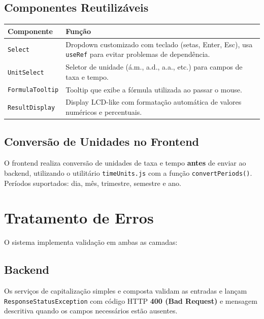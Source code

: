 \documentclass[12pt,a4paper]{article}
\begin{document}
\subsection{Componentes Reutilizáveis}

\begin{center}
\begin{tabular}{lp{8cm}}
  \toprule
  \textbf{Componente} & \textbf{Função} \\
  \midrule
  \texttt{Select}           & Dropdown customizado com teclado (setas, Enter, Esc), usa \texttt{useRef} para evitar problemas de dependência. \\
  \texttt{UnitSelect}       & Seletor de unidade (á.m., a.d., a.a., etc.) para campos de taxa e tempo. \\
  \texttt{FormulaTooltip}   & Tooltip que exibe a fórmula utilizada ao passar o mouse. \\
  \texttt{ResultDisplay}    & Display LCD-like com formatação automática de valores numéricos e percentuais. \\
  \bottomrule
\end{tabular}
\end{center}

\subsection{Conversão de Unidades no Frontend}

O frontend realiza conversão de unidades de taxa e tempo \textbf{antes} de enviar ao backend, utilizando o utilitário \texttt{timeUnits.js} com a função \texttt{convertPeriods()}. Períodos suportados: dia, mês, trimestre, semestre e ano.

\section{Tratamento de Erros}

O sistema implementa validação em ambas as camadas:

\subsection{Backend}

Os serviços de capitalização simples e composta validam as entradas e lançam \texttt{ResponseStatusException} com código HTTP \textbf{400 (Bad Request)} e mensagem descritiva quando os campos necessários estão ausentes.
\end{document}
